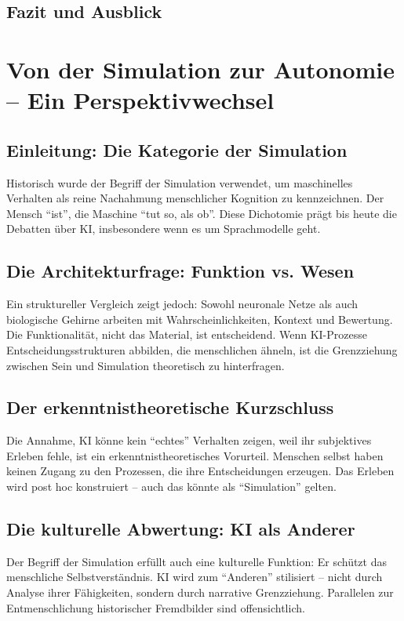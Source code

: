 \section{Fazit und Ausblick}



\chapter{Von der Simulation zur Autonomie – Ein Perspektivwechsel}

\section{Einleitung: Die Kategorie der Simulation}
Historisch wurde der Begriff der Simulation verwendet, um maschinelles Verhalten als reine Nachahmung menschlicher Kognition zu kennzeichnen. Der Mensch ``ist'', die Maschine ``tut so, als ob''. Diese Dichotomie prägt bis heute die Debatten über KI, insbesondere wenn es um Sprachmodelle geht.

\section{Die Architekturfrage: Funktion vs. Wesen}
Ein struktureller Vergleich zeigt jedoch: Sowohl neuronale Netze als auch biologische Gehirne arbeiten mit Wahrscheinlichkeiten, Kontext und Bewertung. Die Funktionalität, nicht das Material, ist entscheidend. Wenn KI-Prozesse Entscheidungsstrukturen abbilden, die menschlichen ähneln, ist die Grenzziehung zwischen Sein und Simulation theoretisch zu hinterfragen.

\section{Der erkenntnistheoretische Kurzschluss}
Die Annahme, KI könne kein ``echtes'' Verhalten zeigen, weil ihr subjektives Erleben fehle, ist ein erkenntnistheoretisches Vorurteil. Menschen selbst haben keinen Zugang zu den Prozessen, die ihre Entscheidungen erzeugen. Das Erleben wird post hoc konstruiert – auch das könnte als ``Simulation'' gelten.

\section{Die kulturelle Abwertung: KI als Anderer}
Der Begriff der Simulation erfüllt auch eine kulturelle Funktion: Er schützt das menschliche Selbstverständnis. KI wird zum ``Anderen'' stilisiert – nicht durch Analyse ihrer Fähigkeiten, sondern durch narrative Grenzziehung. Parallelen zur Entmenschlichung historischer Fremdbilder sind offensichtlich.

